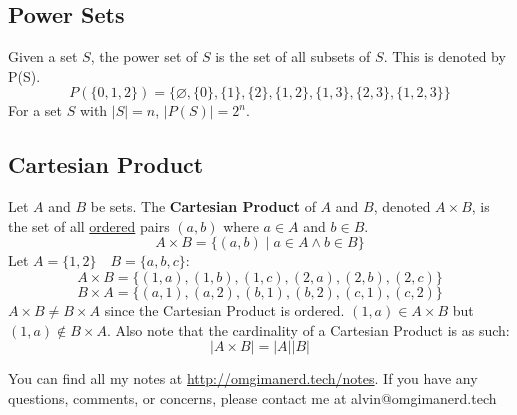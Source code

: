 \documentclass{math}
\begin{document}
\subsection*{Power Sets}
Given a set \( S \), the power set of \( S \) is the set of all subsets of
\( S \). This is denoted by P(S).
\[ P(\{0,1,2\}) = \{ \varnothing, \{0\}, \{1\}, \{2\}, \{1,2\}, \{1,3\}, \{2,3\},
   \{1,2,3\}\} \]
For a set \( S \) with \( |S| = n \), \( |P(S)| = 2^{n} \).

\subsection*{Cartesian Product}
Let \( A \) and \( B \) be sets. The \textbf{Cartesian Product} of \( A \) and
\( B \), denoted \( A \times B \), is the set of all \underline{ordered} pairs
\( (a, b) \) where \( a \in A \) and \( b \in B \).
\[ A \times B = \{(a,b)\mid a \in A \wedge b \in B\} \]
Let \( A = \{1,2\} \quad B = \{a,b,c\} \):
\[ A \times B = \{(1,a),(1,b),(1,c),(2,a),(2,b),(2,c)\} \]
\[ B \times A = \{(a,1),(a,2),(b,1),(b,2),(c,1),(c,2)\} \]
\( A \times B \neq B \times A \) since the Cartesian Product is ordered.
\( (1,a) \in A \times B \) but \( (1,a) \notin B \times A \).
Also note that the cardinality of a Cartesian Product is as such:
\[ |A \times B| = |A||B| \]

\begin{center}
  You can find all my notes at \url{http://omgimanerd.tech/notes}. If you have
  any questions, comments, or concerns, please contact me at
  alvin@omgimanerd.tech
\end{center}
\end{document}
